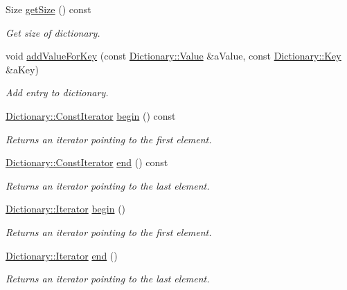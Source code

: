 \begin{DoxyCompactItemize}
$$Size \mbox{\hyperlink{classlibrary_1_1core_1_1ctnr_1_1_dictionary_a54ebf870961949d0f0fbffd6aa62bffa}{get\+Size}} () const
\begin{DoxyCompactList}\small\item\em Get size of dictionary. \end{DoxyCompactList}\item 
void \mbox{\hyperlink{classlibrary_1_1core_1_1ctnr_1_1_dictionary_adea5ef8c3d55b94a219f19cb0100be4b}{add\+Value\+For\+Key}} (const \mbox{\hyperlink{classlibrary_1_1core_1_1ctnr_1_1_dictionary_a3baf6692694e4fc27cb399ac083c88ea}{Dictionary\+::\+Value}} \&a\+Value, const \mbox{\hyperlink{classlibrary_1_1core_1_1ctnr_1_1_dictionary_a987cae687cce70d81a2a483c5e05e842}{Dictionary\+::\+Key}} \&a\+Key)
\begin{DoxyCompactList}\small\item\em Add entry to dictionary. \end{DoxyCompactList}\item 
\mbox{\hyperlink{classlibrary_1_1core_1_1ctnr_1_1_dictionary_1_1_const_iterator}{Dictionary\+::\+Const\+Iterator}} \mbox{\hyperlink{classlibrary_1_1core_1_1ctnr_1_1_dictionary_a083985702fb77f6c6b06d2bd36325455}{begin}} () const
\begin{DoxyCompactList}\small\item\em Returns an iterator pointing to the first element. \end{DoxyCompactList}\item 
\mbox{\hyperlink{classlibrary_1_1core_1_1ctnr_1_1_dictionary_1_1_const_iterator}{Dictionary\+::\+Const\+Iterator}} \mbox{\hyperlink{classlibrary_1_1core_1_1ctnr_1_1_dictionary_ace2fb3bdb88a059090e8b0265d97e57e}{end}} () const
\begin{DoxyCompactList}\small\item\em Returns an iterator pointing to the last element. \end{DoxyCompactList}\item 
\mbox{\hyperlink{classlibrary_1_1core_1_1ctnr_1_1_dictionary_1_1_iterator}{Dictionary\+::\+Iterator}} \mbox{\hyperlink{classlibrary_1_1core_1_1ctnr_1_1_dictionary_a9a3c1e197db1c8dd4db34a650315eba5}{begin}} ()
\begin{DoxyCompactList}\small\item\em Returns an iterator pointing to the first element. \end{DoxyCompactList}\item 
\mbox{\hyperlink{classlibrary_1_1core_1_1ctnr_1_1_dictionary_1_1_iterator}{Dictionary\+::\+Iterator}} \mbox{\hyperlink{classlibrary_1_1core_1_1ctnr_1_1_dictionary_a16ed18981bcf7ffdc7308801cc4b9d56}{end}} ()
\begin{DoxyCompactList}\small\item\em Returns an iterator pointing to the last element. \end{DoxyCompactList}\end{DoxyCompactItemize}
